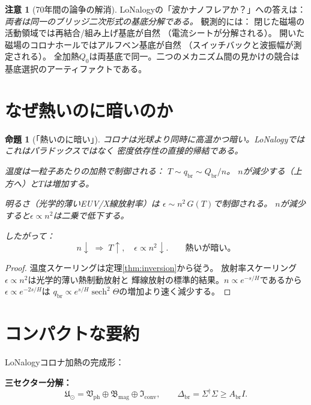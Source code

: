 \documentclass[12pt]{article}
\theoremstyle{plain}
\newtheorem{proposition}[theorem]{命題}
\theoremstyle{definition}
\newtheorem{remark}[theorem]{注意}
\numberwithin{equation}{section}
\newcommand{\br}{\mathrm{br}}
\newcommand{\ph}{\mathrm{ph}}
\newcommand{\fU}{\mathfrak{U}}
\newcommand{\fI}{\mathfrak{I}}
\newcommand{\fV}{\mathfrak{V}}
\newcommand{\fB}{\mathfrak{B}}
\DeclareMathOperator{\sech}{sech}
\begin{document}
\begin{remark}[70年間の論争の解消]
LoNalogyの「波かナノフレアか？」への答えは：
\emph{両者は同一のブリッジ二次形式の基底分解である。}
観測的には：
閉じた磁場の活動領域では再結合/組み上げ基底が自然
（電流シートが分解される）。
開いた磁場のコロナホールではアルフベン基底が自然
（スイッチバックと波振幅が測定される）。
全加熱$Q_0$は両基底で同一。二つのメカニズム間の見かけの競合は
基底選択のアーティファクトである。
\end{remark}


\section{なぜ熱いのに暗いのか}\label{sec:hotdim}

\begin{proposition}[「熱いのに暗い」]\label{prop:hotdim}
コロナは光球より同時に高温かつ暗い。LoNalogyではこれはパラドックスではなく
密度依存性の直接的帰結である。

\emph{温度}は一粒子あたりの加熱で制御される：
$T \sim q_{\br} \sim Q_{\br}/n$。
$n$が減少する（上方へ）と$T$は増加する。

\emph{明るさ}（光学的薄いEUV/X線放射率）は
$\epsilon \sim n^2\,G(T)$で制御される。
$n$が減少すると$\epsilon\propto n^2$は二乗で低下する。

したがって：
\begin{equation}
\boxed{n\downarrow \;\Longrightarrow\; T\uparrow,\quad
\epsilon\propto n^2\downarrow.
\qquad\text{熱いが暗い。}}
\end{equation}
\end{proposition}

\begin{proof}
温度スケーリングは定理\ref{thm:inversion}から従う。
放射率スケーリング$\epsilon\propto n^2$は光学的薄い熱制動放射と
輝線放射の標準的結果。$n\propto e^{-s/H}$であるから
$\epsilon\propto e^{-2s/H}$は
$q_{\br}\propto e^{s/H}\sech^2\Theta$の増加より速く減少する。
\end{proof}


\section{コンパクトな要約}\label{sec:compact}

LoNalogyコロナ加熱の完成形：

\textbf{三セクター分解：}
\begin{equation}
\fU_\odot = \fV_{\ph}\oplus\fB_{\mathrm{mag}}\oplus\fI_{\mathrm{conv}},
\qquad \Delta_{\br}=\Sigma^\dagger\Sigma\geq A_{\br}I.
\end{equation}
\end{document}
